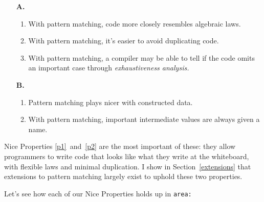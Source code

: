 \documentclass[manuscript,screen,review, 12pt, nonacm]{acmart}
\begin{document}
      \begin{enumerate}
        \item [\textbf{A.}]
        \begin{enumerate}[label=\arabic*]
          \item With pattern matching, code more closely resembles algebraic laws. 
          \label{p1}
          \item With pattern matching, it's easier to avoid duplicating code.
          \label{p2}
          \item With pattern matching, a compiler may be able to tell if the
          code omits an important case through \it{exhaustiveness analysis}.
          \label{p5}
      \end{enumerate}
        
        \item [\textbf{B.}]
        \begin{enumerate}[start=4, label=\arabic*]
          \item Pattern matching plays nicer with constructed data. 
          \label{p3}
          \item With pattern matching, important intermediate values are always
          given a name. 
          \nolinebreak
          \label{p4}
        \end{enumerate}
      \end{enumerate}

    Nice Properties \ref{p1}~and~\ref{p2} are the most important of these: they
    allow programmers to write code that looks like what they write at the
    whiteboard, with flexible laws and minimal duplication. I show in
    Section~\ref{extensions} that extensions to pattern matching largely exist
    to uphold these two properties. 
    
    Let's see how each of our Nice Properties holds up in \tt{area}: 
    
\end{document}
